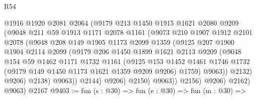 \begin{lexlean}{R54}
\begin{coremodule}
                      @1916
                      @1920
                      @2081
                      @2064
                      (@9179
                        @213
                        @1450
                        @1915
                        @1621
                        @2080
                        @9209
                        (@9048
                          @211
                          @59
                          @1913
                          @1171
                          @2078
                          @1161
                          (@9073
                            @210
                            @1907
                            @1912
                            @2101
                            @2078
                            (@9048
                              @208
                              @149
                              @1905
                              @1173
                              @2099
                              @1359
                              (@9125
                                @207
                                @1900
                                @1904
                                @2114
                                @2099
                                (@9179
                                  @206
                                  @1450
                                  @1899
                                  @1621
                                  @2113
                                  @9209
                                  (@9048
                                    @154
                                    @59
                                    @1462
                                    @1171
                                    @1732
                                    @1161
                                    (@9125
                                      @153
                                      @1452
                                      @1461
                                      @1746
                                      @1732
                                      (@9179 @149 @1450 @1173 @1621 @1359 @9209 @9206)
                                      @1759)
                                    @9063))
                                @2132)
                              @9206)
                            @2138)
                          @9063))
                      @2144)
                    @9206)
                  @2150)
                @9063))
            @2156)
          @9206)
        @2162)
      @9063)
    @2167
@9403 := fun (s : @30) =>
  fun (e : @30) =>
  fun (m : @30) =>

\end{coremodule}
\end{lexlean}
